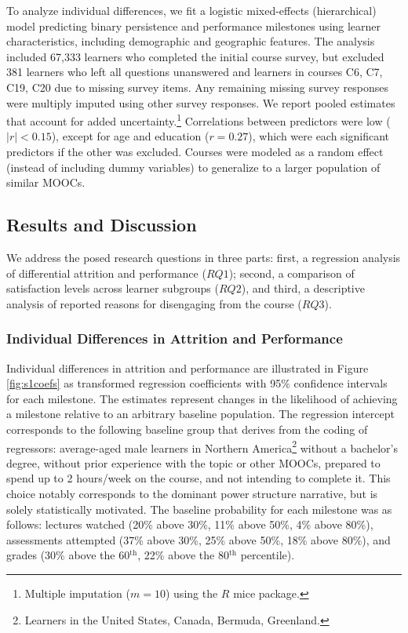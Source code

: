 \documentclass{sigchi}\usepackage[]{graphicx}\usepackage[]{color}
\begin{document}
To analyze individual differences, we fit a logistic mixed-effects (hierarchical) model predicting binary persistence and performance milestones using learner characteristics, including demographic and geographic features. The analysis included 67,333 learners who completed the initial course survey, but excluded 381 learners who left all questions unanswered and learners in courses C6, C7, C19, C20 due to missing survey items. Any remaining missing survey responses were multiply imputed using other survey responses. We report pooled estimates that account for added uncertainty.\footnote{Multiple imputation ($m=10$) using the $R$ mice package.} Correlations between predictors were low ($|r|<0.15$), except for age and education ($r=0.27$), which were each significant predictors if the other was excluded. Courses were modeled as a random effect (instead of including dummy variables) to generalize to a larger population of similar MOOCs.

\subsection{Results and Discussion}

We address the posed research questions in three parts: first, a regression analysis of differential attrition and performance ($RQ1$); second, a comparison of satisfaction levels across learner subgroups ($RQ2$), and third, a descriptive analysis of reported reasons for disengaging from the course ($RQ3$).

\subsubsection{Individual Differences in Attrition and Performance}

Individual differences in attrition and performance are illustrated in Figure \ref{fig:s1coefs} as transformed regression coefficients with 95\% confidence intervals for each milestone. The estimates represent changes in the likelihood of achieving a milestone relative to an arbitrary baseline population. The regression intercept corresponds to the following baseline group that derives from the coding of regressors: average-aged male learners in Northern America\footnote{Learners in the United States, Canada, Bermuda, Greenland.} without a bachelor's degree, without prior experience with the topic or other MOOCs, prepared to spend up to 2 hours/week on the course, and not intending to complete it. This choice notably corresponds to the dominant power structure narrative, but is solely statistically motivated. The baseline probability for each milestone was as follows: lectures watched (20\% above 30\%, 11\% above 50\%, 4\% above 80\%), assessments attempted (37\% above 30\%, 25\% above 50\%, 18\% above 80\%), and grades (30\% above the 60$^\text{th}$, 22\% above the 80$^\text{th}$ percentile).
\end{document}
